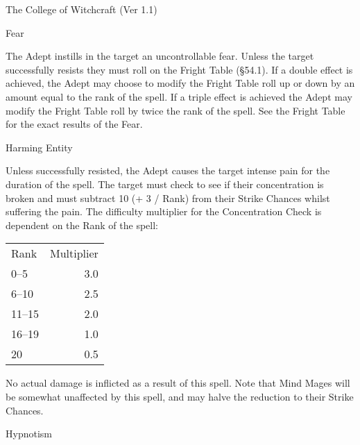 \begin{Chapter}{The College of Witchcraft (Ver 1.1)}
\begin{spell}[G-4]{Fear}
\begin{effects}
The Adept instills in the target an uncontrollable fear. Unless the
target successfully resists they must roll on the Fright Table
(§54.1).  If a double effect is achieved, the Adept may choose to
modify the Fright Table roll up or down by an amount equal to the rank
of the spell.  If a triple effect is achieved the Adept may modify the
Fright Table roll by twice the rank of the spell.  See the Fright
Table for the exact results of the Fear.
\end{effects}
\end{spell}

\begin{spell}[G-5]{Harming Entity}

\begin{effects}
Unless successfully resisted, the Adept causes the target intense pain
for the duration of the spell.  The target must check to see if their
concentration is broken and must subtract 10 (+ 3 / Rank) from their
Strike Chances whilst suffering the pain.  The difficulty multiplier
for the Concentration Check is dependent on the Rank of the spell:

\begin{tabularx}{\columnwidth}{lr}
Rank	& Multiplier \\
0--5	& 3.0 \\
6--10	& 2.5 \\
11--15	& 2.0 \\
16--19	& 1.0 \\
20	& 0.5 \\
\end{tabularx}

No actual damage is inflicted as a result of this spell.  Note that
Mind Mages will be somewhat unaffected by this spell, and may halve
the reduction to their Strike Chances.
\end{effects}
\end{spell}

\begin{spell}[G-6]{Hypnotism}


\end{spell}
\end{Chapter}
